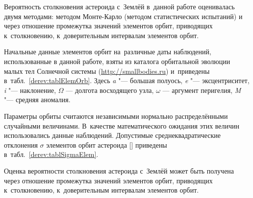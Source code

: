 Вероятность столкновения астероида с~Землёй в~данной работе оценивалась двумя методами: 
методом Монте-Карло (методом статистических испытаний) и через отношение промежутка значений элементов орбит,  приводящих к~столкновению, к~доверительным интервалам элементов орбит.

Начальные данные элементов орбит на~различные даты наблюдений, использованные в данной работе, взяты из
каталога орбитальной эволюции малых тел Солнечной системы (\mbox{\url{http://smallbodies.ru}}) и~приведены  в~табл.~\ref{derev:tablElemOrb}. Здесь \emph{a} "--- большая полуось, \emph{e} "--- эксцентриситет, \emph{i} "--- наклонение, $\Omega$ --- долгота восходящего узла,
$\omega$ --- аргумент перигелия, \emph{M} "--- средняя аномалия.



Параметры орбиты считаются независимыми нормально распределёнными  случайными величинами. 
В~качестве математического ожидания этих величин использовались данные наблюдений.
Допустимые среднеквадратические отклонения $\sigma$ элементов орбит астероида  [] приведены в~табл.~\ref{derev:tablSigmaElem}.

Оценка вероятности столкновения астероида с~Землёй может быть получена  через отношение промежутка значений элементов орбит, приводящих к~столкновению, к~доверительным интервалам элементов орбит.

